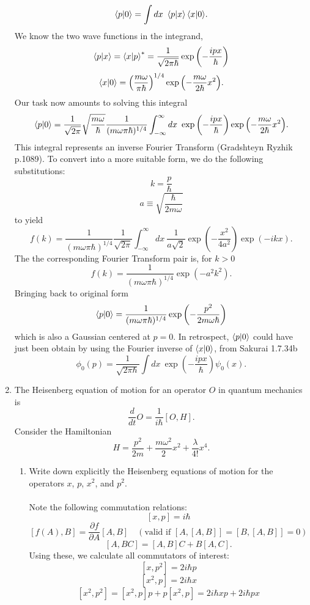 \documentclass[11pt,letterpaper]{article}
\begin{document}
\begin{enumerate}
$$\braket{p|0} = \int{dx\ \braket{p|x}\braket{x|0}}.$$
We know the two wave functions in the integrand,
$$\braket{p|x} = \braket{x|p}^* = \frac{1}{\sqrt{2\pi\hbar}}\exp{\left(-\frac{ipx}{\hbar}\right)}$$
$$\braket{x|0} = \left(\frac{m\omega}{\pi\hbar}\right)^{1/4}\exp{\left(-\frac{m\omega}{2\hbar}x^{2}\right)}.$$
Our task now amounts to solving this integral
\begin{equation}\label{10}\braket{p|0} = \frac{1}{\sqrt{2\pi}}\sqrt{\frac{m\omega}{\hbar}}\frac{1}{(m\omega\pi\hbar)^{1/4}}\int_{-\infty}^\infty{dx\ \exp{\left(-\frac{ipx}{\hbar}\right)}\exp{\left(-\frac{m\omega}{2\hbar}x^2\right)}}.\end{equation}
This integral represents an inverse Fourier Transform (Gradshteyn Ryzhik p.1089). To convert into a more suitable form, we do the following substitutions:
$$k = \frac{p}{\hbar}$$
$$a \equiv \sqrt{\frac{\hbar}{2m\omega}}$$
to yield
\begin{equation}\label{11}
f(k) = \frac{1}{(m\omega\pi\hbar)^{1/4}}\frac{1}{\sqrt{2\pi}}\int^\infty_{-\infty}{dx\ \frac{1}{a\sqrt 2}\exp{\left(-\frac{x^2}{4a^2}\right)}\exp{\left(-ikx\right)}}.
\end{equation}
The the corresponding Fourier Transform pair is, for $k>0$
$$f(k) = \frac{1}{(m\omega\pi\hbar)^{1/4}}\exp{\left(-a^2k^2\right)}.$$
Bringing back to original form
$$\braket{p|0} = \frac{1}{(m\omega\pi\hbar)^{1/4}}\exp{\left(-\frac{p^2}{2m\omega\hbar}\right)}$$
which is also a Gaussian centered at $p=0$. In retrospect, $\braket{p|0}$ could have just been obtain by using the Fourier inverse of $\braket{x|0}$, from Sakurai 1.7.34b
$$\phi_0(p) =\frac{1}{\sqrt{2\pi\hbar}}\int{dx\ \exp{\left(-\frac{ipx}{\hbar}\right)}\psi_0(x)}.$$
\item The Heisenberg equation of motion for an operator $O$ in quantum mechanics is
$$\frac{d}{dt}O = \frac{1}{i\hbar}[O,H].$$
Consider the Hamiltonian
$$H = \frac{p^2}{2m}+\frac{m\omega^2}{2}x^2+\frac{\lambda}{4!}x^4.$$
\begin{enumerate}
\item Write down explicitly the Heisenberg equations of motion for the operators $x$, $p$, $x^2$, and $p^2$.
\\ \\Note the following commutation relations:
$$[x,p] = i\hbar$$
$$[f(A),B] =\frac{\partial f}{\partial A}[A,B]\quad (\text{valid if }[A,[A,B]]=[B,[A,B]]=0)$$ 
$$[A,BC] = [A,B]C+B[A,C].$$
Using these, we calculate all commutators of interest:
$$[x,p^2] = 2i\hbar p$$
$$[x^2,p] = 2i\hbar x$$
$$[x^2,p^2] = [x^2,p]p+p[x^2,p]=2i\hbar xp+2i\hbar px$$

\end{enumerate}
\end{enumerate}
\end{document}
